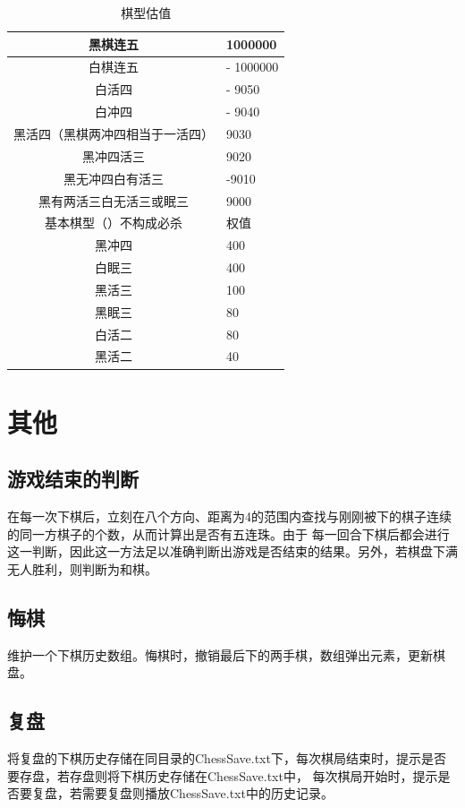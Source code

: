 \documentclass{acm_proc_article-sp}
\begin{document}
\begin{table}
	\centering
	\caption{棋型估值}
	\begin{tabular}{|c|l|} \hline
	黑棋连五 & 1000000 \\ \hline
	 白棋连五 &- 1000000 \\ \hline
	 白活四 &- 9050 \\ \hline
	 白冲四 &- 9040 \\ \hline
	 黑活四（黑棋两冲四相当于一活四） &9030 \\ \hline
	 黑冲四活三& 9020 \\ \hline
	 黑无冲四白有活三 &-9010\\ \hline
	 
	 黑有两活三白无活三或眠三& 9000 \\ \hline
	基本棋型（）不构成必杀 &  权值\\ \hline
	 黑冲四 &  400\\ \hline
	 白眠三 &  400\\ \hline
	 黑活三 &  100\\ \hline
     黑眠三 &  80\\ \hline
     白活二    &  80\\ \hline
     黑活二     &  40\\ \hline
	\end{tabular}
\end{table}
\section{其他}
\subsection{游戏结束的判断}
在每一次下棋后，立刻在八个方向、距离为4的范围内查找与刚刚被下的棋子连续的同一方棋子的个数，从而计算出是否有五连珠。由于
每一回合下棋后都会进行这一判断，因此这一方法足以准确判断出游戏是否结束的结果。另外，若棋盘下满无人胜利，则判断为和棋。
\subsection{悔棋}
维护一个下棋历史数组。悔棋时，撤销最后下的两手棋，数组弹出元素，更新棋盘。\\
\subsection{复盘}
将复盘的下棋历史存储在同目录的ChessSave.txt下，每次棋局结束时，提示是否要存盘，若存盘则将下棋历史存储在ChessSave.txt中，
每次棋局开始时，提示是否要复盘，若需要复盘则播放ChessSave.txt中的历史记录。\\
\end{document}

